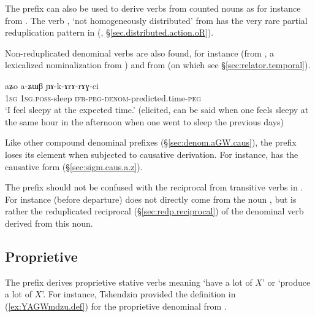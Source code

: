 The  prefix can also be used to derive verbs from counted nouns as for instance  from . The verb , `not homogeneously distributed' from  has the very rare partial reduplication pattern in  (, §\ref{sec.distributed.action.oR}).

Non-reduplicated  denominal verbs are also found, for instance    (from , a lexicalized nominalization from ) and  from  (on which see §\ref{sec:relator.temporal}).

\begin{exe}
\ex \label{ex:YAkArArAGCi}
\gll aʑo a-ʑɯβ ɲɤ-k-ɤrɤ-rɤɣ-ci \\
 \textsc{1sg} \textsc{1sg}.\textsc{poss}-sleep \textsc{ifr}-\textsc{peg}-\textsc{denom}-predicted.time-\textsc{peg} \\
\glt `I feel sleepy at the expected time.' (elicited, can be said when one feels sleepy at the same hour in the afternoon when one went to sleep the previous days)
\end{exe}

Like other compound denominal prefixes (§\ref{sec:denom.aGW.caus}), the  prefix loses its  element when subjected to causative derivation. For instance,  has the causative form  (§\ref{sec:sigm.caus.a.z}).


The  prefix should not be confused with the reciprocal from transitive verbs in . For instance  (before departure) does not directly come from the noun , but is rather the reduplicated reciprocal (§\ref{sec:redp.reciprocal}) of the denominal verb  derived from this noun.
 
\subsection{Proprietive } \label{sec:denom.aGW}  
The prefix  derives proprietive stative verbs meaning `have a lot of $X$' or `produce a lot of $X$'. For instance, Tshendzin provided the definition in (\ref{ex:YAGWmdzu.def}) for the proprietive denominal  from .

